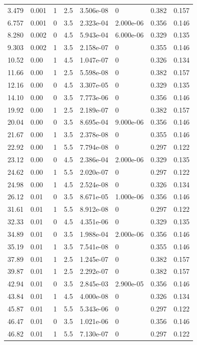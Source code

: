 \documentclass[preview]{standalone}
\begin{document}
{{\begin{tabular}{L{1.2cm}C{1.2cm} C{0.3cm}C{0.5cm} C{1.4cm}C{1.4cm} C{1.4cm}C{1.4cm}}
  3.479  &  0.001  & 1     & 2.5 &  3.506e-08  & 0  & 0.382 &  0.157   \\ 
  6.757  &  0.001  & 0     & 3.5 &  2.323e-04  & 2.000e-06  & 0.356 &  0.146   \\ 
  8.280  &  0.002  & 0     & 4.5 &  5.943e-04  & 6.000e-06  & 0.329 &  0.135   \\ 
  9.303  &  0.002  & 1     & 3.5 &  2.158e-07  & 0  & 0.355 &  0.146   \\ 
  10.52  &  0.00  & 1     & 4.5 &  1.047e-07  & 0  & 0.326 &  0.134   \\ 
  11.66  &  0.00  & 1     & 2.5 &  5.598e-08  & 0  & 0.382 &  0.157   \\ 
  12.16  &  0.00  & 0     & 4.5 &  3.307e-05  & 0  & 0.329 &  0.135   \\ 
  14.10  &  0.00  & 0     & 3.5 &  7.773e-06  & 0  & 0.356 &  0.146   \\ 
  19.92  &  0.00  & 1     & 2.5 &  2.189e-07  & 0  & 0.382 &  0.157   \\ 
  20.04  &  0.00  & 0     & 3.5 &  8.695e-04  & 9.000e-06  & 0.356 &  0.146   \\ 
  21.67  &  0.00  & 1     & 3.5 &  2.378e-08  & 0  & 0.355 &  0.146   \\ 
  22.92  &  0.00  & 1     & 5.5 &  7.794e-08  & 0  & 0.297 &  0.122   \\ 
  23.12  &  0.00  & 0     & 4.5 &  2.386e-04  & 2.000e-06  & 0.329 &  0.135   \\ 
  24.62  &  0.00  & 1     & 5.5 &  2.020e-07  & 0  & 0.297 &  0.122   \\ 
  24.98  &  0.00  & 1     & 4.5 &  2.524e-08  & 0  & 0.326 &  0.134   \\ 
  26.12  &  0.01  & 0     & 3.5 &  8.671e-05  & 1.000e-06  & 0.356 &  0.146   \\ 
  31.61  &  0.01  & 1     & 5.5 &  8.912e-08  & 0  & 0.297 &  0.122   \\ 
  32.33  &  0.01  & 0     & 4.5 &  4.351e-06  & 0  & 0.329 &  0.135   \\ 
  34.89  &  0.01  & 0     & 3.5 &  1.988e-04  & 2.000e-06  & 0.356 &  0.146   \\ 
  35.19  &  0.01  & 1     & 3.5 &  7.541e-08  & 0  & 0.355 &  0.146   \\ 
  37.89  &  0.01  & 1     & 2.5 &  1.245e-07  & 0  & 0.382 &  0.157   \\ 
  39.87  &  0.01  & 1     & 2.5 &  2.292e-07  & 0  & 0.382 &  0.157   \\ 
  42.94  &  0.01  & 0     & 3.5 &  2.845e-03  & 2.900e-05  & 0.356 &  0.146   \\ 
  43.84  &  0.01  & 1     & 4.5 &  4.000e-08  & 0  & 0.326 &  0.134   \\ 
  45.87  &  0.01  & 1     & 5.5 &  5.343e-06  & 0  & 0.297 &  0.122   \\ 
  46.47  &  0.01  & 0     & 3.5 &  1.021e-06  & 0  & 0.356 &  0.146   \\ 
  46.82  &  0.01  & 1     & 5.5 &  7.130e-07  & 0  & 0.297 &  0.122   \\ 
\hline 
\end{tabular} 

}}
\end{document}
